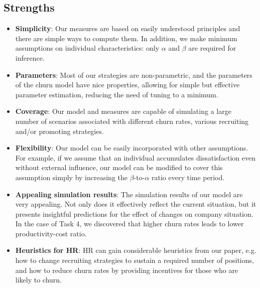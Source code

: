 \documentclass[tcn = 37075, sheet = false, abstract = false]{mcmthesis}
\begin{document}
\subsection{Strengths}
\begin{itemize}
\item \textbf{Simplicity}: Our measures are based on easily understood principles and there are simple ways to compute them. In addition, we make minimum assumptions on individual characteristics: only $\alpha$ and $\beta$ are required for inference. 
\item \textbf{Parameters}: Most of our strategies are non-parametric, and the parameters of the churn model have nice properties, allowing for simple but effective parameter estimation, reducing the need of tuning to a minimum.
\item \textbf{Coverage}: Our model and measures are capable of simulating a large number of scenarios associated with different churn rates, various recruiting and/or promoting strategies.
\item \textbf{Flexibility}: Our model can be easily incorporated with other assumptions. For example, if we assume that an individual accumulates dissatisfaction even without external influence, our model can be modified to cover this assumption simply by increasing the $\beta$-to-$\alpha$ ratio every time period.
\item \textbf{Appealing simulation results}: The simulation results of our model are very appealing. Not only does it effectively reflect the current situation, but it presents insightful predictions for the effect of changes on company situation. In the case of Task 4, we discovered that higher churn rates leads to lower productivity-cost ratio. 
\item \textbf{Heuristics for HR}: HR can gain considerable heuristics from our paper, e.g. how to change recruiting strategies to sustain a required number of positions, and how to reduce churn rates by providing incentives for those who are likely to churn.

\end{itemize}
\end{document}
